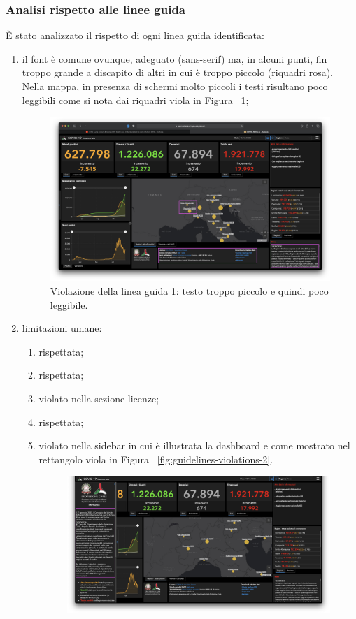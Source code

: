 \subsubsection{Analisi rispetto alle linee guida}
\label{sss:analisi-rispetto-linee-guida}
\`E stato analizzato il rispetto di ogni linea guida identificata:
\begin{enumerate}
    \item il font è comune ovunque, adeguato (sans-serif) ma, in alcuni punti, fin troppo grande a discapito di altri in cui è troppo piccolo (riquadri rosa). Nella mappa, in presenza di schermi molto piccoli i testi risultano poco leggibili come si nota dai riquadri viola in Figura ~\ref{fig:guidelines-violations-1};
        \begin{figure}[H]
        \centering
        \includegraphics[width=0.5\columnwidth]{../../../assets/images/verifica-risorse-esistenti/guidelines_violations_1}
        \caption{Violazione della linea guida 1: testo troppo piccolo e quindi poco leggibile.}
        \label{fig:guidelines-violations-1}
    \end{figure}
    \item limitazioni umane:
        \begin{enumerate}[label=\alph*.]
                \item rispettata;
                \item rispettata;
                \item [\ref{lg:2.c}] violato nella sezione licenze;
                \item [d.] rispettata;
                \item [\ref{lg:2.e}] violato nella sidebar in cui è illustrata la dashboard e come mostrato nel rettangolo viola in Figura ~\ref{fig:guidelines-violations-2}.
                \begin{figure}[H]
                    \centering
                    \includegraphics[width=0.5\columnwidth]{../../../assets/images/verifica-risorse-esistenti/guidelines_violations_2}

\end{figure}
\end{enumerate}
\end{enumerate}

